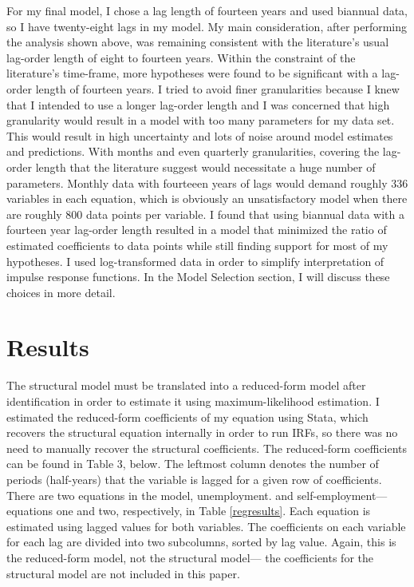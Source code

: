 \documentclass[]{ecca}
\begin{document}
For my final model, I chose a lag length of fourteen years and used biannual data, so I have twenty-eight lags in my model. My main consideration, after performing the analysis shown above, was remaining consistent with the literature's usual lag-order length of eight to fourteen years. Within the constraint of the literature's time-frame, more hypotheses were found to be significant with a lag-order length of fourteen years. I tried to avoid finer granularities because I knew that I intended to use a longer lag-order length and I was concerned that high granularity would result in a model with too many parameters for my data set. This would result in high uncertainty and lots of noise around model estimates and predictions. With months and even quarterly granularities, covering the lag-order length that the literature suggest would necessitate a huge number of parameters. Monthly data with fourteeen years of lags would demand roughly 336 variables in each equation, which is obviously an unsatisfactory model when there are roughly 800 data points per variable. I found that using biannual data with a fourteen year lag-order length resulted in a model that minimized the ratio of estimated coefficients to data points while still finding support for most of my hypotheses. I used log-transformed data in order to simplify interpretation of impulse response functions. In the Model Selection section, I will discuss these choices in more detail.


\section{Results}

The structural model must be translated into a reduced-form model after identification in order to estimate it using maximum-likelihood estimation. I estimated the reduced-form coefficients of my equation using Stata, which recovers the structural equation internally in order to run IRFs, so there was no need to manually recover the structural coefficients. The reduced-form coefficients can be found in Table 3, below. The leftmost column denotes the number of periods (half-years) that the variable is lagged for a given row of coefficients. There are two equations in the model, unemployment. and self-employment--- equations one and two, respectively, in Table \ref{regresults}. Each equation is estimated using lagged values for both variables. The coefficients on each variable for each lag are divided into two subcolumns, sorted by lag value. Again, this is the reduced-form model, not the structural model--- the coefficients for the structural model are not included in this paper.
\end{document}
